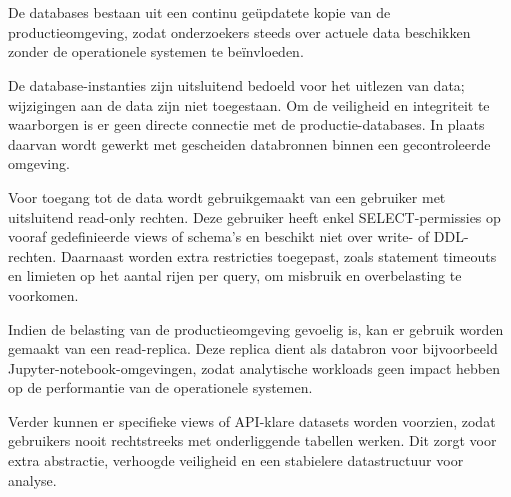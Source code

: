 \section{}
\label{ch:architecture-db}

De databases bestaan uit een continu geüpdatete kopie van de productieomgeving, zodat onderzoekers steeds over actuele data beschikken zonder de operationele systemen te beïnvloeden.

De database-instanties zijn uitsluitend bedoeld voor het uitlezen van data; wijzigingen aan de data zijn niet toegestaan. Om de veiligheid en integriteit te waarborgen is er geen directe connectie met de productie-databases. In plaats daarvan wordt gewerkt met gescheiden databronnen binnen een gecontroleerde omgeving.

Voor toegang tot de data wordt gebruikgemaakt van een gebruiker met uitsluitend read-only rechten. Deze gebruiker heeft enkel SELECT-permissies op vooraf gedefinieerde views of schema’s en beschikt niet over write- of DDL-rechten. Daarnaast worden extra restricties toegepast, zoals statement timeouts en limieten op het aantal rijen per query, om misbruik en overbelasting te voorkomen.

Indien de belasting van de productieomgeving gevoelig is, kan er gebruik worden gemaakt van een read-replica. Deze replica dient als databron voor bijvoorbeeld Jupyter-notebook-omgevingen, zodat analytische workloads geen impact hebben op de performantie van de operationele systemen.

Verder kunnen er specifieke views of API-klare datasets worden voorzien, zodat gebruikers nooit rechtstreeks met onderliggende tabellen werken. Dit zorgt voor extra abstractie, verhoogde veiligheid en een stabielere datastructuur voor analyse.
